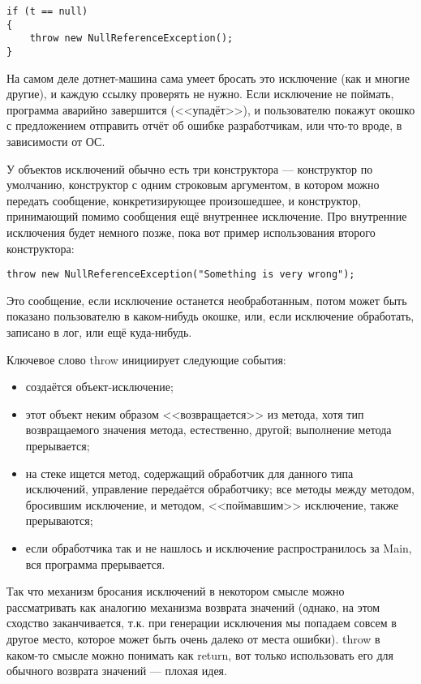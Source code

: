\documentclass[a5paper]{article}
\begin{document}
\begin{verbatim}
if (t == null)
{
    throw new NullReferenceException();
}
\end{verbatim}

На самом деле дотнет-машина сама умеет бросать это исключение (как и многие другие), и каждую ссылку проверять не нужно. Если исключение не поймать, программа аварийно завершится (<<упадёт>>), и пользователю покажут окошко с предложением отправить отчёт об ошибке разработчикам, или что-то вроде, в зависимости от ОС. 

У объектов исключений обычно есть три конструктора --- конструктор по умолчанию, конструктор с одним строковым аргументом, в котором можно передать сообщение, конкретизирующее произошедшее, и конструктор, принимающий помимо сообщения ещё внутреннее исключение. Про внутренние исключения будет немного позже, пока вот пример использования второго конструктора:

\begin{verbatim}
throw new NullReferenceException("Something is very wrong");
\end{verbatim}

Это сообщение, если исключение останется необработанным, потом может быть показано пользователю в каком-нибудь окошке, или, если исключение обработать, записано в лог, или ещё куда-нибудь.

Ключевое слово throw инициирует следующие события:

\begin{itemize}
    \item создаётся объект-исключение;
    \item этот объект неким образом <<возвращается>> из метода, хотя тип возвращаемого значения метода, естественно, другой; выполнение метода прерывается;
    \item на стеке ищется метод, содержащий обработчик для данного типа исключений, управление передаётся обработчику; все методы между методом, бросившим исключение, и методом, <<поймавшим>> исключение, также прерываются;
    \item если обработчика так и не нашлось и исключение распространилось за Main, вся программа прерывается.
\end{itemize}

Так что механизм бросания исключений в некотором смысле можно рассматривать как аналогию механизма возврата значений (однако, на этом сходство заканчивается, т.к. при генерации исключения мы попадаем совсем в другое место, которое может быть очень далеко от места ошибки). throw в каком-то смысле можно понимать как return, вот только использовать его для обычного возврата значений --- плохая идея.
\end{document}
